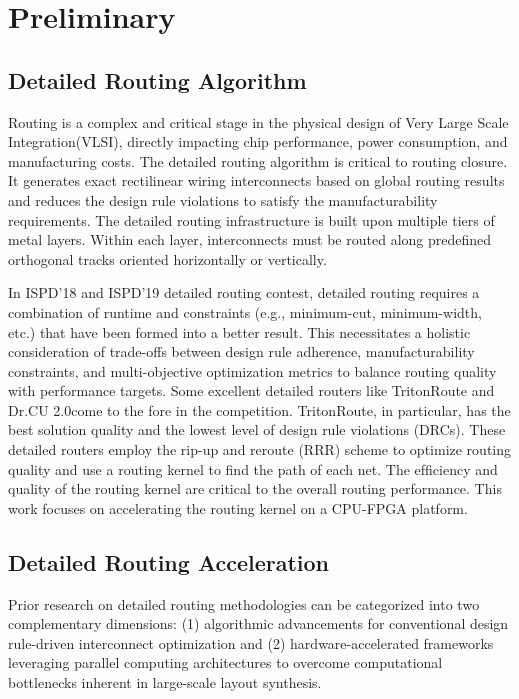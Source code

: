 \section{Preliminary}\label{sec:background_0329}

\subsection{Detailed Routing Algorithm}

Routing is a complex and critical stage in the physical design of Very Large Scale Integration(VLSI), directly impacting chip performance, power consumption, and manufacturing costs. 
The detailed routing algorithm is critical to routing closure. It generates exact rectilinear wiring interconnects based on global routing results and reduces the design rule violations to satisfy the manufacturability requirements. 
The detailed routing infrastructure is built upon multiple tiers of metal layers. Within each layer, interconnects must be routed along predefined orthogonal tracks oriented horizontally or vertically. 

In ISPD'18\cite{IS2018} and ISPD'19\cite{IS2019} detailed routing contest, detailed routing requires a combination of runtime and constraints (e.g., minimum-cut, minimum-width, etc.) that have been formed into a better result. 
This necessitates a holistic consideration of trade-offs between design rule adherence, manufacturability constraints, and multi-objective optimization metrics to balance routing quality with performance targets. 
Some excellent detailed routers like TritonRoute\cite{Tr2021} and Dr.CU 2.0\cite{Dr2019}come to the fore in the competition. TritonRoute, in particular, has the best solution quality and the lowest level of design rule violations (DRCs). 
These detailed routers employ the rip-up and reroute (RRR) scheme to optimize routing quality and use a routing kernel to find the path of each net. The efﬁciency and quality of the routing kernel are critical to the overall routing performance. 
This work focuses on accelerating the routing kernel on a CPU-FPGA platform.

\subsection{Detailed Routing Acceleration}

Prior research on detailed routing methodologies can be categorized into two complementary dimensions: (1) algorithmic advancements for conventional design rule-driven interconnect optimization and 
(2) hardware-accelerated frameworks leveraging parallel computing architectures to overcome computational bottlenecks inherent in large-scale layout synthesis.

